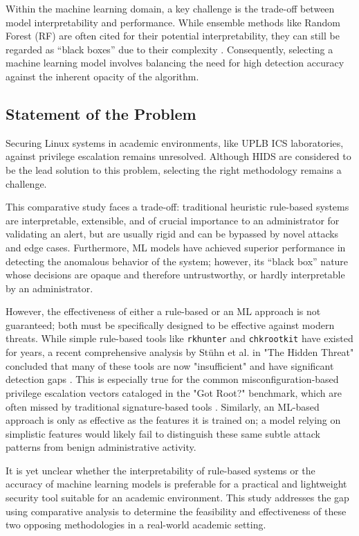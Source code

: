 \documentclass[journal]{./IEEEtran}
\begin{document}
Within the machine learning domain, a key challenge is the trade-off between model interpretability and performance. While ensemble methods like Random Forest (RF) are often cited for their potential interpretability, they can still be regarded as ``black boxes'' due to their complexity \cite{pereira2018}. Consequently, selecting a machine learning model involves balancing the need for high detection accuracy against the inherent opacity of the algorithm.

\subsection{Statement of the Problem}
Securing Linux systems in academic environments, like UPLB ICS laboratories, against privilege escalation remains unresolved. Although HIDS are considered to be the lead solution to this problem, selecting the right methodology remains a challenge.

This comparative study faces a trade-off: traditional heuristic rule-based systems are interpretable, extensible, and of crucial importance to an administrator for validating an alert, but are usually rigid and can be bypassed by novel attacks and edge cases. Furthermore, ML models have achieved superior performance in detecting the anomalous behavior of the system; however, its “black box” nature whose decisions are opaque and therefore untrustworthy, or hardly interpretable by an administrator.

However, the effectiveness of either a rule-based or an ML approach is not guaranteed; both must be specifically designed to be effective against modern threats. While simple rule-based tools like \texttt{rkhunter} and \texttt{chkrootkit} have existed for years, a recent comprehensive analysis by Stühn et al. in "The Hidden Threat" concluded that many of these tools are now "insufficient" and have significant detection gaps \cite{stuhn2024}. This is especially true for the common misconfiguration-based privilege escalation vectors cataloged in the "Got Root?" benchmark, which are often missed by traditional signature-based tools \cite{happe2024}. Similarly, an ML-based approach is only as effective as the features it is trained on; a model relying on simplistic features would likely fail to distinguish these same subtle attack patterns from benign administrative activity.

It is yet unclear whether the interpretability of rule-based systems or the accuracy of machine learning models is preferable for a practical and lightweight security tool suitable for an academic environment. This study addresses the gap using comparative analysis to determine the feasibility and effectiveness of these two opposing methodologies in a real-world academic setting.
\end{document}
